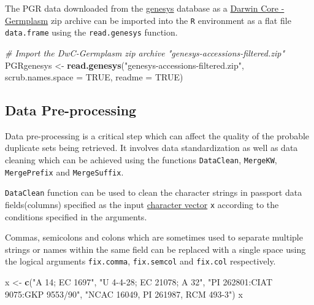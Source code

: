 \documentclass[
]{article}
\newenvironment{Shaded}{\begin{snugshade}}{\end{snugshade}}
\newcommand{\CommentTok}[1]{\textcolor[rgb]{0.56,0.35,0.01}{\textit{#1}}}
\newcommand{\DataTypeTok}[1]{\textcolor[rgb]{0.13,0.29,0.53}{#1}}
\newcommand{\KeywordTok}[1]{\textcolor[rgb]{0.13,0.29,0.53}{\textbf{#1}}}
\newcommand{\NormalTok}[1]{#1}
\newcommand{\OtherTok}[1]{\textcolor[rgb]{0.56,0.35,0.01}{#1}}
\newcommand{\StringTok}[1]{\textcolor[rgb]{0.31,0.60,0.02}{#1}}
\begin{document}
The PGR data downloaded from the
\href{https://www.genesys-pgr.org/welcome}{genesys} database as a
\href{https://github.com/dagendresen/darwincore-germplasm}{Darwin Core -
Germplasm} zip archive can be imported into the \texttt{R} environment
as a flat file \texttt{data.frame} using the \texttt{read.genesys}
function.

\begin{Shaded}
\begin{Highlighting}[]
\CommentTok{# Import the DwC-Germplasm zip archive "genesys-accessions-filtered.zip"}
\NormalTok{PGRgenesys <-}\StringTok{ }\KeywordTok{read.genesys}\NormalTok{(}\StringTok{"genesys-accessions-filtered.zip"}\NormalTok{,}
                           \DataTypeTok{scrub.names.space =} \OtherTok{TRUE}\NormalTok{, }\DataTypeTok{readme =} \OtherTok{TRUE}\NormalTok{)}
\end{Highlighting}
\end{Shaded}

\hypertarget{data-pre-processing}{%
\subsection{Data Pre-processing}\label{data-pre-processing}}

Data pre-processing is a critical step which can affect the quality of
the probable duplicate sets being retrieved. It involves data
standardization as well as data cleaning which can be achieved using the
functions \texttt{DataClean}, \texttt{MergeKW}, \texttt{MergePrefix} and
\texttt{MergeSuffix}.

\texttt{DataClean} function can be used to clean the character strings
in passport data fields(columns) specified as the input
\href{http://google.com/\#q=\%5BR\%5D+character+vector}{character
vector} \texttt{x} according to the conditions specified in the
arguments.

Commas, semicolons and colons which are sometimes used to separate
multiple strings or names within the same field can be replaced with a
single space using the logical arguments \texttt{fix.comma},
\texttt{fix.semcol} and \texttt{fix.col} respectively.

\begin{Shaded}
\begin{Highlighting}[]
\NormalTok{x <-}\StringTok{ }\KeywordTok{c}\NormalTok{(}\StringTok{"A 14; EC 1697"}\NormalTok{, }\StringTok{"U 4-4-28; EC 21078; A 32"}\NormalTok{, }\StringTok{"PI 262801:CIAT 9075:GKP 9553/90"}\NormalTok{,}
       \StringTok{"NCAC 16049, PI 261987, RCM 493-3"}\NormalTok{)}
\NormalTok{x}
\end{Highlighting}
\end{Shaded}
\end{document}
